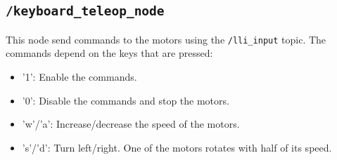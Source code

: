 \subsection*{\lstinline[style=cinline]{/keyboard_teleop_node}}
This node send commands to the motors using the \lstinline[style=cinline]{/lli_input} topic. The commands depend on the keys that are pressed:
\begin{itemize}
    \item '1': Enable the commands.
    \item '0': Disable the commands and stop the motors.
    \item 'w'/'a': Increase/decrease the speed of the motors.
    \item 's'/'d': Turn left/right. One of the motors rotates with half of its speed.
\end{itemize}


